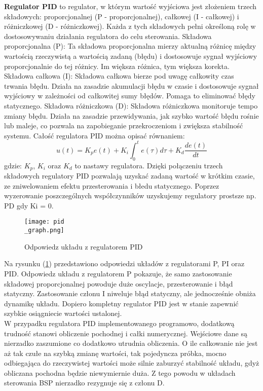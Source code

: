 \textbf{Regulator PID}  to regulator, w którym wartość wyjściowa jest złożeniem trzech składowych: proporcjonalnej (P - proporcjonalnej), całkowej (I - całkowej) i różniczkowej (D - różniczkowej). Każda z tych składowych pełni określoną rolę w dostosowywaniu działania regulatora do celu sterowania.
Składowa proporcjonalna (P): Ta składowa proporcjonalna mierzy aktualną różnicę między wartością rzeczywistą a wartością zadaną (błędu) i dostosowuje sygnał wyjściowy proporcjonalnie do tej różnicy. Im większa różnica, tym większa korekta.
Składowa całkowa (I): Składowa całkowa bierze pod uwagę całkowity czas trwania błędu. Działa na zasadzie akumulacji błędu w czasie i dostosowuje sygnał wyjściowy w zależności od całkowitej sumy błędów. Pomaga to eliminować błędy statycznego.
Składowa różniczkowa (D): Składowa różniczkowa monitoruje tempo zmiany błędu. Działa na zasadzie przewidywania, jak szybko wartość błędu rośnie lub maleje, co pozwala na zapobieganie przekroczeniom i zwiększa stabilność systemu.
Całość regulatora PID można opisać równaniem:
\[
	u(t) = K_p e(t) + K_i \int_{0}^{t} e(\tau) d\tau + K_d \frac{de(t)}{dt}
\]
gdzie: $K_p$, $K_i$ oraz $K_d$ to nastawy regulatora. Dzięki połączeniu trzech składowych regulatory PID pozwalają uzyskać zadaną wartość w krótkim czasie, ze zniwelowaniem efektu przesterowania i błedu statycznego. Poprzez wyzerowanie poszczególnych współczynników uzyskujemy regulatory prostsze np. PD gdy Ki = 0.\\

\begin{figure}[!h]
   	\centering
      	\texttt{[image: pid\\\_graph.png]}
      	\caption{Odpowiedz układu z regulatorem PID}
      	\label{pid_respose}
\end{figure}

Na rysunku (\ref{pid_respose}) przedstawiono odpowiedzi układów z regulatorami P, PI oraz PID. Odpowiedz układu z regulatorem P pokazuje, że samo zastosowanie składowej proporcjonalnej powoduje duże oscylacje, przesterowanie i błąd statyczny. Zastosowanie członu I niweluje błąd statyczny, ale jednocześnie obniża dynamikę układu. Dopiero kompletny regulator PID jest w stanie zapewnić szybkie osiągniecie wartości ustalonej.\\

W przypadku regulatora PID implementowanego programowo, dodatkową trudność stanowi obliczenie pochodnej i całki numerycznej. Wejściowe dane są nierzadko zaszumione co dodatkowo utrudnia obliczenia. O ile całkowanie nie jest aż tak czułe na szybką zmianę wartości, tak pojedyncza próbka, mocno odbiegająca do rzeczywistej wartości może silnie zaburzyć stabilność układu, gdyż obliczana pochodna będzie niewymiernie duża. Z tego powodu w układach sterowania BSP nierzadko rezygnuje się z członu D.\\

